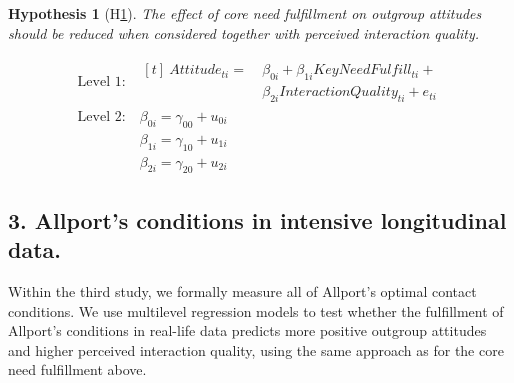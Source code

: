 \documentclass[man, 12pt, a4paper, mask]{apa7}
\theoremstyle{break}
\theoremstyle{plain}
\newtheorem{subhyp}{Hypothesis}
\begin{document}
\begin{mdframed}[style=mdfhypothesis]
    \begin{subhyp}[H\ref{hyp:keyNeedMediation}] \label{hyp:keyNeedMediation}
    \addtolength{\leftskip}{\subhypskip}
    The effect of core need fulfillment on outgroup attitudes should be reduced when considered together with perceived interaction quality.
    \end{subhyp}
    
    \begin{fleqn}[\eqskip]
      \begin{equation} \label{eq:SlopesAttCoreQual}
        \begin{split}
          \textrm{Level 1:} &
            \begin{aligned}[t]
              \ Attitude_{ti} =  &\ \beta_{0i} + \beta_{1i}KeyNeedFulfill_{ti} + \\
                                 &\ \beta_{2i}InteractionQuality_{ti} + e_{ti}
            \end{aligned} \\
          \textrm{Level 2:} &\ \beta_{0i} = \gamma_{00} + u_{0i} \\
                            &\ \beta_{1i} = \gamma_{10} + u_{1i} \\
                            &\ \beta_{2i} = \gamma_{20} + u_{2i}
        \end{split} 
      \end{equation}
    \end{fleqn}
\end{mdframed}

\subsection{3. Allport's conditions in intensive longitudinal data.}
Within the third study, we formally measure all of Allport's optimal contact conditions. We use multilevel regression models to test whether the fulfillment of Allport's conditions in real-life data predicts more positive outgroup attitudes and higher perceived interaction quality, using the same approach as for the core need fulfillment above.
\end{document}
